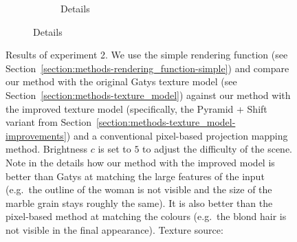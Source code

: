 \begin{figure}[]
\begin{subfigure}{\textwidth}
\begin{subfigure}{0.78\textwidth}
\begin{subfigure}{0.32\textwidth}
                \begin{subfigure}{\textwidth}
                    \centering
                \end{subfigure}
            \end{subfigure}
            \caption*{Details}
        \end{subfigure}
    \end{subfigure}
    \caption{Results of experiment 2. We use the simple rendering function (see Section~\ref{section:methods-rendering_function-simple}) and compare our method with the original Gatys texture model (see Section~\ref{section:methods-texture_model}) against our method with the improved texture model (specifically, the Pyramid + Shift variant from Section~\ref{section:methods-texture_model-improvements}) and a conventional pixel-based projection mapping method. Brightness \(c\) is set to \(5\) to adjust the difficulty of the scene. Note in the details how our method with the improved model is better than Gatys at matching the large features of the input (e.g.~the outline of the woman is not visible and the size of the marble grain stays roughly the same). It is also better than the pixel-based method at matching the colours (e.g.~the blond hair is not visible in the final appearance). Texture source: \citet{Pixar128}}
    \label{fig:ex02-human-marble}
\end{figure}

